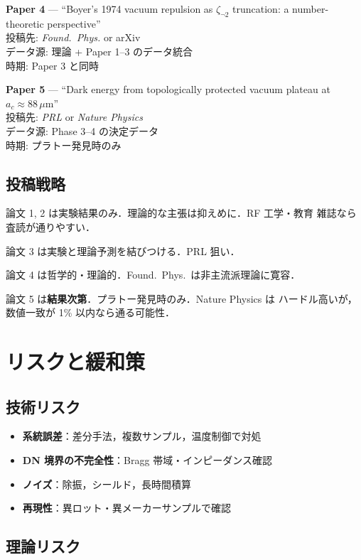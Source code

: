 \documentclass[11pt,a4paper]{article}
\begin{document}
\textbf{Paper 4} — ``Boyer's 1974 vacuum repulsion as
$\zeta_{\neg 2}$ truncation: a number-theoretic perspective''\\
投稿先: \textit{Found.\ Phys.} or arXiv\\
データ源: 理論 + Paper 1--3 のデータ統合\\
時期: Paper 3 と同時

\textbf{Paper 5} — ``Dark energy from topologically protected
vacuum plateau at $a_c \approx 88\,\mu$m''\\
投稿先: \textit{PRL} or \textit{Nature Physics}\\
データ源: Phase 3--4 の決定データ\\
時期: プラトー発見時のみ

\subsection{投稿戦略}

論文 1, 2 は実験結果のみ．理論的な主張は抑えめに．RF 工学・教育
雑誌なら査読が通りやすい．

論文 3 は実験と理論予測を結びつける．PRL 狙い．

論文 4 は哲学的・理論的．Found.\ Phys.\ は非主流派理論に寛容．

論文 5 は\textbf{結果次第}．プラトー発見時のみ．Nature Physics は
ハードル高いが，数値一致が 1\% 以内なら通る可能性．

\section{リスクと緩和策}

\subsection{技術リスク}

\begin{itemize}
\item \textbf{系統誤差}：差分手法，複数サンプル，温度制御で対処
\item \textbf{DN 境界の不完全性}：Bragg 帯域・インピーダンス確認
\item \textbf{ノイズ}：除振，シールド，長時間積算
\item \textbf{再現性}：異ロット・異メーカーサンプルで確認
\end{itemize}

\subsection{理論リスク}
\end{document}
